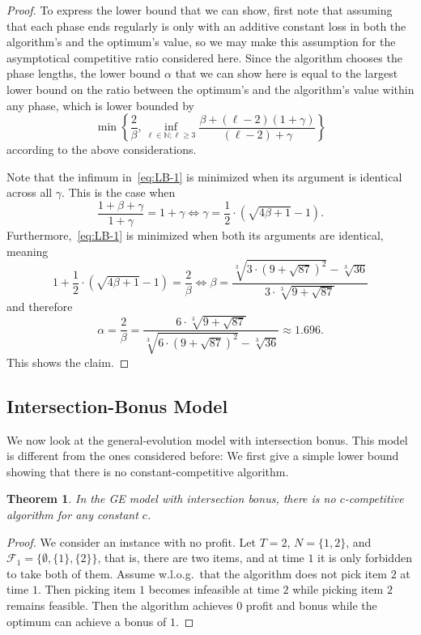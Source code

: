 \documentclass[a4paper]{book}
\newtheorem{theorem}{Theorem}[chapter]
\newtheorem{proof}{\noindent{\bf Proof.} }
\newcommand\hard{Intersection}
\begin{document}
\begin{proof}
	To express the lower bound that we can show, first note that assuming that each phase ends regularly is only with an additive constant loss in both the algorithm's and the optimum's value, so we may make this assumption for the asymptotical competitive ratio considered here. Since the algorithm chooses the phase lengths, the lower bound $\alpha$ that we can show here is equal to the largest lower bound on the ratio between the optimum's and the algorithm's value within any phase, which is lower bounded by \begin{equation}\label{eq:LB-1}
	    \min\left\{\frac{2}{\beta},\inf_{\ell\in \mathbb{N};\ell\geq3}\frac{\beta+(\ell-2)(1+\gamma)}{(\ell-2)+\gamma}\right\}
	\end{equation}
	according to the above considerations.
	
	Note that the infimum in~\eqref{eq:LB-1} is minimized when its argument is identical across all $\gamma$. This is the case when $$\frac{1+\beta+\gamma}{1+\gamma}=1+\gamma\Leftrightarrow \gamma=\frac12\cdot(\sqrt{4\beta+1}-1).$$ Furthermore,~\eqref{eq:LB-1} is minimized when both its arguments are identical, meaning $$1+\frac12\cdot(\sqrt{4\beta+1}-1)=\frac2\beta\Leftrightarrow\beta=\frac{\sqrt[3]{3\cdot(9 + \sqrt{87})^2}-\sqrt[3]{36}}{3\cdot\sqrt[3]{9 + \sqrt{87}}}$$ and therefore $$\alpha=\frac2\beta=\frac{6\cdot\sqrt[3]{9 + \sqrt{87}}}{\sqrt[3]{6\cdot(9 + \sqrt{87})^2}-\sqrt[3]{36}}\approx1.696.$$ This shows the claim. %
\end{proof}

\subsection{\hard{}-Bonus Model}
\label{subsec:general-intersection}

We now look at the general-evolution model with intersection bonus. This model is different from the ones considered before: We first give a simple lower bound showing that there is no constant-competitive algorithm.

\begin{theorem}\label{thm:general-intersection-lower}
   In the GE model with intersection bonus, there is no $c$-competitive algorithm for any constant $c$.
\end{theorem}
\begin{proof}
We consider an instance with no profit. Let $T=2$, $N=\{1,2\}$, and $\mathcal{F}_1=\{\emptyset,\{1\},\{2\}\}$, that is, there are two items, and at time $1$ it is only forbidden to take both of them. Assume w.l.o.g.\ that the algorithm does not pick item $2$ at time $1$. Then picking item $1$ becomes infeasible at time $2$ while picking item $2$ remains feasible. Then the algorithm achieves $0$ profit and bonus while the optimum can achieve a bonus of $1$. %
\end{proof}
\end{document}

